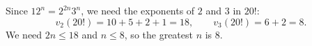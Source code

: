 Since $12^n=2^{2n}3^n$, we need the exponents of $2$ and $3$ in $20!$:
\[v_2(20!)=10+5+2+1=18,\qquad v_3(20!)=6+2=8.\]
We need $2n\le18$ and $n\le8$, so the greatest $n$ is $\boxed{8}$.
